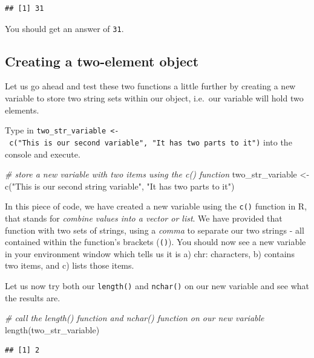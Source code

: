 \documentclass[
]{book}
\newenvironment{Shaded}{\begin{snugshade}}{\end{snugshade}}
\newcommand{\CommentTok}[1]{\textcolor[rgb]{0.56,0.35,0.01}{\textit{#1}}}
\newcommand{\FunctionTok}[1]{\textcolor[rgb]{0.00,0.00,0.00}{#1}}
\newcommand{\NormalTok}[1]{#1}
\newcommand{\OtherTok}[1]{\textcolor[rgb]{0.56,0.35,0.01}{#1}}
\newcommand{\StringTok}[1]{\textcolor[rgb]{0.31,0.60,0.02}{#1}}
\begin{document}
\begin{verbatim}
## [1] 31
\end{verbatim}

You should get an answer of \texttt{31}.

\hypertarget{creating-a-two-element-object}{%
\subsection{Creating a two-element object}\label{creating-a-two-element-object}}

Let us go ahead and test these two functions a little further by creating a new variable to store two string sets within our object, i.e.~our variable will hold two elements.

Type in \texttt{two\_str\_variable\ \textless{}-\ c("This\ is\ our\ second\ variable",\ "It\ has\ two\ parts\ to\ it")} into the console and execute.

\begin{Shaded}
\begin{Highlighting}[]
\CommentTok{\# store a new variable with two items using the c() function}
\NormalTok{two\_str\_variable }\OtherTok{\textless{}{-}} \FunctionTok{c}\NormalTok{(}\StringTok{"This is our second string variable"}\NormalTok{, }\StringTok{"It has two parts to it"}\NormalTok{)}
\end{Highlighting}
\end{Shaded}

In this piece of code, we have created a new variable using the \texttt{c()} function in R, that stands for \emph{combine values into a vector or list}. We have provided that function with two sets of strings, using a \emph{comma} to separate our two strings - all contained within the function's brackets (\texttt{()}). You should now see a new variable in your environment window which tells us it is a) chr: characters, b) contains two items, and c) lists those items.

Let us now try both our \texttt{length()} and \texttt{nchar()} on our new variable and see what the results are.

\begin{Shaded}
\begin{Highlighting}[]
\CommentTok{\# call the length() function and nchar() function on our new variable}
\FunctionTok{length}\NormalTok{(two\_str\_variable)}
\end{Highlighting}
\end{Shaded}

\begin{verbatim}
## [1] 2
\end{verbatim}
\end{document}

